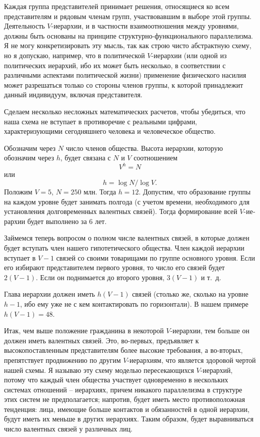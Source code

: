 \documentclass{book}
\begin{document}
Каждая группа представителей принимает решения, относя­щиеся ко всем представителям и рядовым членам групп, участ­вовавшим в выборе этой группы. Деятельность $V$-иерархии, и в частности взаимоотношения между уровнями, должны быть основаны на принципе структурно-функционального паралле­лизма. Я не могу конкретизировать эту мысль, так как строю чисто абстрактную схему, но я допускаю, например, что в политической $V$-иерархии (или одной из политических иерархий, ибо их может быть несколько, в соответствии с различными ас­пектами политической жизни) применение физического наси­лия может разрешаться только со стороны членов группы, к которой принадлежит данный индивидуум, включая представи­теля.

Сделаем несколько несложных математических расчетов, чтобы убедиться, что наша схема не вступает в противоречие с реальными цифрами, характеризующими сегодняшнего чело­века и человеческое общество.

Обозначим через $N$  число членов общества. Высота иерархии, которую обозначим через $h$,  будет связана с $N$ и $V$  соотношением
\[
	V^h=N
\]
или 
\[
	h = \log N / \log V. 
\]
Положим $V=5$, $N=250$ млн. Тогда $h=12$.  Допустим, что образование группы на каждом уровне будет занимать полго­да (с учетом времени, необходимого для установления долго­временных валентных связей). Тогда формирование всей $V$-ие­рархии будет выполнено за 6 лет.

Займемся теперь вопросом о полном числе валентных связей, в которые должен будет вступать член нашего гипотетического общества. Член каждой иерархии вступает в $V-1$  связей со свои­ми товарищами по группе основного уровня. Если его избирают представителем первого уровня, то число его связей будет $2(V-1)$.  Если он поднимается до второго уровня, $3(V-1)$  и т.~д.

Глава иерархии должен иметь $h(V-1)$  связей (столько же, сколько на уровне $h - 1$, ибо ему уже не с кем контактировать по горизонтали). В нашем примере $h (V - 1) = 48$.

Итак, чем выше положение гражданина в некоторой $V$-иерар­хии, тем больше он должен иметь валентных связей. Это, во-первых, предъявляет к высокопоставленным представителям более высокие требования, а во-вторых, препятствует продви­жению по другим $V$-иерархиям, что является здоровой чертой нашей схемы. Я называю эту схему моделью пересекающихся $V$-иерархий, потому что каждый член общества участвует од­новременно в нескольких системах отношений -- иерархиях, причем никакого параллелизма в структуре этих систем не предполагается; напротив, будет иметь место противоположная тенденция: лица, имеющие больше контактов и обязанностей в одной иерархии, будут иметь их меньше в других иерархиях. Таким образом, будет выравниваться число валентных связей у различных лиц.
\end{document}
